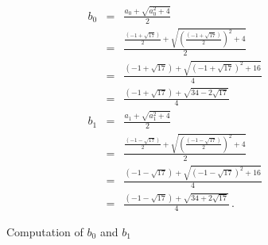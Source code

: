 \begin{figure}[t]
\begin{eqnarray*}
b_0&=&\frac{a_0+\sqrt{a_0^2+4}}{2}\\
&=&\frac{
     \displaystyle\frac{(-1+\sqrt{17})}{2} + 
     \sqrt{\left(\displaystyle\frac{(-1+\sqrt{17})}{2}\right)^2+4}
   }{2}\\
&=&\frac{
     (-1+\sqrt{17}) + 
     \sqrt{\left(-1+\sqrt{17}\right)^2+16}
   }{4}\\
&=&\frac{
     (-1+\sqrt{17}) + 
     \sqrt{34-2\sqrt{17}}
   }{4}\\
b_1&=&\frac{a_1+\sqrt{a_1^2+4}}{2}\\
&=&\frac{
     \displaystyle\frac{(-1-\sqrt{17})}{2} + 
     \sqrt{\left(\displaystyle\frac{(-1-\sqrt{17})}{2}\right)^2+4}
   }{2}\\
&=&\frac{
     (-1-\sqrt{17}) + 
     \sqrt{\left(-1-\sqrt{17}\right)^2+16}
   }{4}\\
&=&\frac{
     (-1-\sqrt{17}) + 
     \sqrt{34+2\sqrt{17}}
   }{4}\,.
\end{eqnarray*}
\caption{Computation of $b_0$ and $b_1$}\label{f.b0b1}
\end{figure}

\newpage

